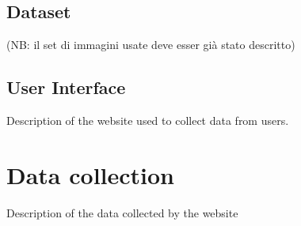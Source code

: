 \subsection{Dataset}

(NB: il set di immagini usate deve esser già stato descritto)

\subsection{User Interface}

Description of the website used to collect data from users.

\vspace{0.5cm}

\section{Data collection}

Description of the data collected by the website